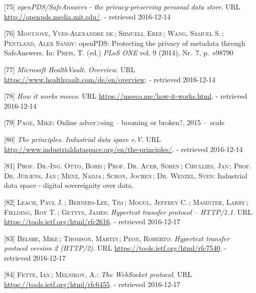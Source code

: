 \documentclass[12pt,english,a4paper,titlepage,cleardoublepage=empty,dottedtoc]{report}
\begin{document}
\hypertarget{ref-web_mit_openpds-safeanswers-project-page}{}
{[}75{]} \emph{openPDS/SafeAnswers - the privacy-preserving personal
data store}. URL \url{http://openpds.media.mit.edu/}. - retrieved
2016-12-14

\hypertarget{ref-paper_2014_openpds_protecting-privacy-of-meta-data-through-safeanswers}{}
{[}76{]} \textsc{Montjoye, Yves-Alexandre de}\,; \textsc{Shmueli,
Erez}\,; \textsc{Wang, Samuel S.}\,; \textsc{Pentland, Alex Sandy}:
openPDS: Protecting the privacy of metadata through SafeAnswers. In:
\textsc{Preis, T.} (ed.) \emph{PLoS ONE} vol. 9 (2014), Nr.~7, p.~e98790

\hypertarget{ref-web_microsoft_healthvault}{}
{[}77{]} \emph{Microsoft HealthVault. Overview}. URL
\url{https://www.healthvault.com/de/en/overview}. - retrieved 2016-12-14

\hypertarget{ref-web_meeco_how-it-works}{}
{[}78{]} \emph{How it works meeco}. URL
\url{https://meeco.me/how-it-works.html}. - retrieved 2016-12-14

\hypertarget{ref-slides_2015_meeco-case-study}{}
{[}79{]} \textsc{Page, Mike}: Online adver\textgreater{}sing -- booming
or broken?, 2015 --~scale

\hypertarget{ref-web_industrial-data-space}{}
{[}80{]} \emph{The principles. Industrial data space e.V.} URL
\url{http://www.industrialdataspace.org/en/the-principles/}. - retrieved
2016-12-14

\hypertarget{ref-whitepaper_2016_industrial-data-space}{}
{[}81{]} \textsc{Prof. Dr.-Ing. Otto, Boris}\,; \textsc{Prof. Dr. Auer,
Sören}\,; \textsc{Cirullies, Jan}\,; \textsc{Prof. Dr. Jürjens, Jan}\,;
\textsc{Menz, Nadja}\,; \textsc{Schon, Jochen}\,; \textsc{Dr. Wenzel,
Sven}: Industrial data space - digital sovereignity over data.

\hypertarget{ref-web_spec_http1}{}
{[}82{]} \textsc{Leach, Paul J.}\,; \textsc{Berners-Lee, Tim}\,;
\textsc{Mogul, Jeffrey C.}\,; \textsc{Masinter, Larry}\,;
\textsc{Fielding, Roy T.}\,; \textsc{Gettys, James}: \emph{Hypertext
transfer protocol -- HTTP/1.1}. URL
\url{https://tools.ietf.org/html/rfc2616}. - retrieved 2016-12-17

\hypertarget{ref-web_spec_http2}{}
{[}83{]} \textsc{Belshe, Mike}\,; \textsc{Thomson, Martin}\,;
\textsc{Peon, Roberto}: \emph{Hypertext transfer protocol version 2
(HTTP/2)}. URL \url{https://tools.ietf.org/html/rfc7540}. - retrieved
2016-12-17

\hypertarget{ref-web_spec_websockets}{}
{[}84{]} \textsc{Fette, Ian}\,; \textsc{Melnikov, A.}: \emph{The
WebSocket protocol}. URL \url{https://tools.ietf.org/html/rfc6455}. -
retrieved 2016-12-17
\end{document}
